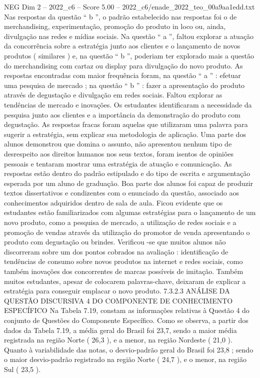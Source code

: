 \begin{textsample}{NEG Dim 2 – 2022\_c6 – Score 5.00 – 2022\_c6/enade\_2022\_teo\_00a9aa1edd.txt}
Nas respostas da questão “ b ”, o padrão estabelecido nas respostas foi o de merchandising, experimentação, promoção do produto in loco ou, ainda, divulgação nas redes e mídias sociais.
Na questão “ a ”, faltou explorar a atuação da concorrência sobre a estratégia junto aos clientes e o lançamento de novos produtos ( similares ) e, na questão “ b ”, poderiam ter explorado mais a questão do merchandising com cartaz ou display para divulgação do novo produto.
As respostas encontradas com maior frequência foram, na questão “ a ” : efetuar uma pesquisa de mercado ; na questão “ b ” : fazer a apresentação do produto através de degustação e divulgação em redes sociais.
Faltou explorar as tendências de mercado e inovações.
Os estudantes identificaram a necessidade da pesquisa junto aos clientes e a importância da demonstração do produto com degustação.
As respostas fracas foram aquelas que utilizaram uma palavra para sugerir a estratégia, sem explicar sua metodologia de aplicação.
Uma parte dos alunos demonstrou que domina o assunto, não apresentou nenhum tipo de desrespeito aos direitos humanos nos seus textos, foram isentos de opiniões pessoais e tentaram mostrar uma estratégia de atuação e comunicação.
As respostas estão dentro do padrão estipulado e do tipo de escrita e argumentação esperada por um aluno de graduação.
Boa parte dos alunos foi capaz de produzir textos dissertativos e condizentes com o enunciado da questão, associado aos conhecimentos adquiridos dentro de sala de aula.
Ficou evidente que os estudantes estão familiarizados com algumas estratégias para o lançamento de um novo produto, como a pesquisa de mercado, a utilização de redes sociais e a promoção de vendas através da utilização do promotor de venda apresentando o produto com degustação ou brindes.
Verificou -se que muitos alunos não discorreram sobre um dos pontos cobrados na avaliação : identificação de tendências de consumo sobre novos produtos na internet e redes sociais, como também inovações dos concorrentes de marcas possíveis de imitação.
Também muitos estudantes, apesar de colocarem palavras-chave, deixaram de explicar a estratégia para conseguir emplacar o novo produto. 7.3.2.3 ANÁLISE DA QUESTÃO DISCURSIVA 4 DO COMPONENTE DE CONHECIMENTO ESPECÍFICO Na Tabela 7.19, constam as informações relativas à Questão 4 do conjunto de Questões do Componente Específico.
Como se observa, a partir dos dados da Tabela 7.19, a média geral do Brasil foi 23,7, sendo a maior média registrada na região Norte ( 26,3 ), e a menor, na região Nordeste ( 21,0 ).
Quanto à variabilidade das notas, o desvio-padrão geral do Brasil foi 23,8 ; sendo o maior desvio-padrão registrado na região Norte ( 24,7 ), e o menor, na região Sul ( 23,5 ).

\end{textsample}
